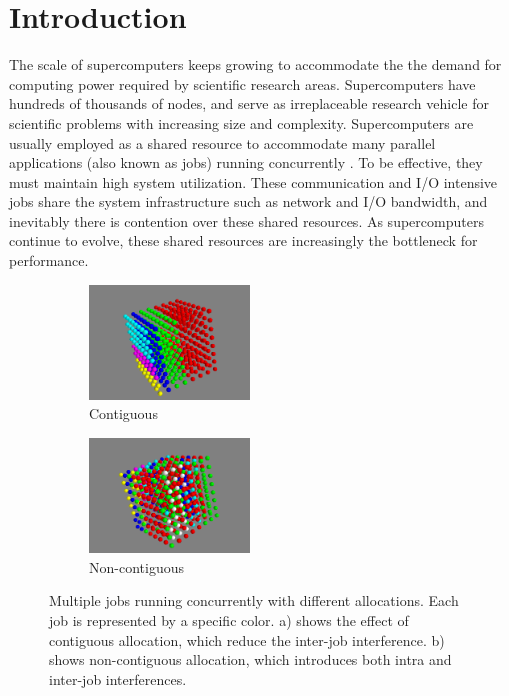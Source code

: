\documentclass[conference]{IEEEtran}
\begin{document}
\IEEEpeerreviewmaketitle


\section{Introduction} 
\label{sec: intro}

The scale of supercomputers keeps growing to accommodate the the demand for computing power required by scientific research areas. Supercomputers have hundreds of thousands of nodes, and serve as irreplaceable research vehicle for scientific problems with increasing size and complexity. Supercomputers are usually employed as a shared resource to accommodate many parallel applications (also known as jobs) running concurrently \cite{zhou-ipdps}. To be effective, they must maintain high system utilization. These communication and I/O intensive jobs share the system infrastructure such as network and I/O bandwidth, and inevitably there is contention over these shared resources. As supercomputers continue to evolve, these shared resources are increasingly the bottleneck for performance.


\begin{figure}[h!]
    \centering
    \begin{subfigure}[t]{0.2\textwidth}
        \centering
        \includegraphics[height=1.2in]{figs/goodallocation}
        \caption{Contiguous}
        \label{fig:overview_sub1}
    \end{subfigure}%
    \hspace{1em}%
    \begin{subfigure}[t]{0.2\textwidth}
        \centering
        \includegraphics[height=1.2in]{figs/badallocation}
        \caption{Non-contiguous}
        \label{fig:overview_sub2}
    \end{subfigure}%
   \caption{Multiple jobs running concurrently with different allocations. Each job is represented by a specific color. a) shows the effect of contiguous allocation, which reduce the inter-job interference. b) shows non-contiguous allocation, which introduces both intra and inter-job interferences. }
   \label{fig:overview}
\end{figure}
\end{document}
